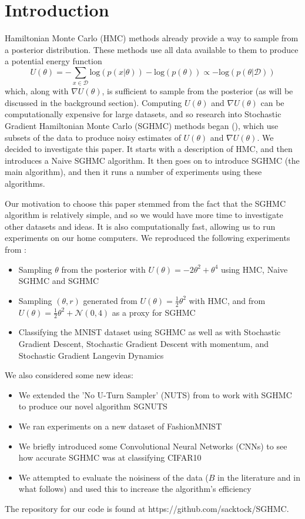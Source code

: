 
\section{Introduction}

Hamiltonian Monte Carlo (HMC) methods already provide a way to sample from a posterior distribution. These methods use all data available to them to produce a potential energy function $$U(\theta) = - \sum_{x\in\mathcal{D}}\text{log}(p(x| \theta)) - \text{log}(p(\theta )) \propto -\text{log}(p(\theta | \mathcal{D}))$$
which, along with $\nabla U(\theta)$, is sufficient to sample from the posterior (as will be discussed in the background section). Computing $U(\theta)$ and $\nabla U(\theta)$ can be computationally expensive for large datasets, and so research into Stochastic Gradient Hamiltonian Monte Carlo (SGHMC) methods began (\cite{sghmc}), which use subsets of the data to produce noisy estimates of $U(\theta)$ and $\nabla U(\theta)$. We decided to investigate this paper. It starts with a description of HMC, and then introduces a Naive SGHMC algorithm. It then goes on to introduce SGHMC (the main algorithm), and then it runs a number of experiments using these algorithms.

Our motivation to choose this paper stemmed from the fact that the SGHMC algorithm is relatively simple, and so we would have more time to investigate other datasets and ideas. It is also computationally fast, allowing us to run experiments on our home computers. We reproduced the following experiments from \cite{sghmc}:

\begin{itemize}
    \item Sampling $\theta$ from the posterior with $U(\theta) = -2\theta^2 + \theta^4$ using HMC, Naive SGHMC and SGHMC
    \item Sampling $(\theta,r)$ generated from $U(\theta) = \frac{1}{2}\theta^2$ with HMC, and from $U(\theta) = \frac{1}{2}\theta^2 + \mathcal{N}(0,4)$ as a proxy for SGHMC
    \item Classifying the MNIST dataset using SGHMC as well as with Stochastic Gradient Descent, Stochastic Gradient Descent with momentum, and Stochastic Gradient Langevin Dynamics
\end{itemize}

We also considered some new ideas:

\begin{itemize}
    \item We extended the 'No U-Turn Sampler' (NUTS) from \cite{nuts} to work with SGHMC to produce our novel algorithm SGNUTS
    \item We ran experiments on a new dataset of FashionMNIST
    \item We briefly introduced some Convolutional Neural Networks (CNNs) to see how accurate SGHMC was at classifying CIFAR10
    \item We attempted to evaluate the noisiness of the data ($B$ in the literature and in what follows) and used this to increase the algorithm's efficiency
\end{itemize}

The repository for our code is found at https://github.com/sacktock/SGHMC.
